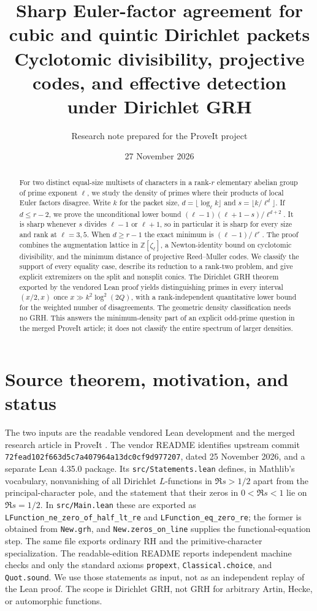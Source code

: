 \documentclass[11pt]{article}
\title{Sharp Euler-factor agreement for cubic and quintic Dirichlet packets\\[4pt]\large Cyclotomic divisibility, projective codes, and effective detection under Dirichlet GRH}
\author{Research note prepared for the ProveIt project}
\date{27 November 2026}
\theoremstyle{remark}\newtheorem{remark}[theorem]{Remark}
\newcommand{\Z}{\mathbb Z}
\begin{document}
\maketitle
\begin{abstract}
For two distinct equal-size multisets of characters in a rank-$r$ elementary abelian group of prime exponent $\ell$, we study the density of primes where their products of local Euler factors disagree. Write $k$ for the packet size, $d=\lfloor\log_\ell k\rfloor$ and $s=\lfloor k/\ell^d\rfloor$. If $d\le r-2$, we prove the unconditional lower bound $(\ell-1)(\ell+1-s)/\ell^{d+2}$. It is sharp whenever $s$ divides $\ell-1$ or $\ell+1$, so in particular it is sharp for every size and rank at $\ell=3,5$. When $d\ge r-1$ the exact minimum is $(\ell-1)/\ell^r$. The proof combines the augmentation lattice in $\Z[\zeta_\ell]$, a Newton-identity bound on cyclotomic divisibility, and the minimum distance of projective Reed--Muller codes. We classify the support of every equality case, describe its reduction to a rank-two problem, and give explicit extremizers on the split and nonsplit conics. The Dirichlet GRH theorem exported by the vendored Lean proof yields distinguishing primes in every interval $(x/2,x)$ once $x\gg k^2\log^2(2Q)$, with a rank-independent quantitative lower bound for the weighted number of disagreements. The geometric density classification needs no GRH. This answers the minimum-density part of an explicit odd-prime question in the merged ProveIt article; it does not classify the entire spectrum of larger densities.
\end{abstract}
\tableofcontents

\section{Source theorem, motivation, and status}
The two inputs are the readable vendored Lean development and the merged research article in ProveIt \cite{vendor,article}. The vendor README identifies upstream commit \texttt{72fead102f663d5c7a407}\allowbreak\texttt{964a13dc0cf9d977207}, dated 25 November 2026, and a separate Lean 4.35.0 package. Its \texttt{src/Statements.lean} defines, in Mathlib's vocabulary, nonvanishing of all Dirichlet $L$-functions in $\Re s>1/2$ apart from the principal-character pole, and the statement that their zeros in $0<\Re s<1$ lie on $\Re s=1/2$. In \texttt{src/Main.lean} these are exported as \nolinkurl{LFunction_ne_zero_of_half_lt_re} and \nolinkurl{LFunction_eq_zero_re}; the former is obtained from \texttt{New.grh}, and \texttt{New.zeros\_on\_line} supplies the functional-equation step. The same file exports ordinary RH and the primitive-character specialization. The readable-edition README reports independent machine checks and only the standard axioms \texttt{propext}, \texttt{Classical.choice}, and \texttt{Quot.sound}. We use those statements as input, not as an independent replay of the Lean proof. The scope is Dirichlet GRH, not GRH for arbitrary Artin, Hecke, or automorphic functions.
\end{document}

